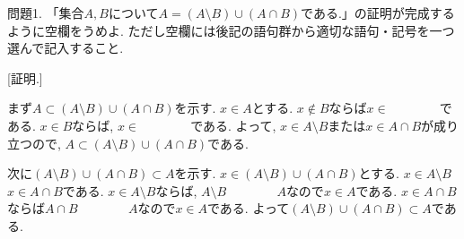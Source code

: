 \documentclass[dvipdfmx,a4paper,11pt]{article}
\theoremstyle{definition}
\begin{document}

\medskip
問題1. 「集合$A,B$について$A  = (A \setminus B) \cup (A \cap B)$である.」の証明が完成するように空欄をうめよ. ただし空欄には後記の語句群から適切な語句・記号を一つ選んで記入すること. %

[証明.]

まず$A \subset (A \setminus B) \cup (A \cap B)$を示す. 
$x \in A$とする. $x \not \in B$ならば$x \in \boxed{\phantom{hogehoge}}$である.
$x \in B$ならば, $x \in \boxed{\phantom{hogehoge}}$である.
よって, $x \in A \setminus B$または$x \in A \cap B$が成り立つので, $A \subset (A \setminus B) \cup (A \cap B)$である.

次に$(A \setminus B) \cup (A \cap B)\subset A$を示す.
$x \in (A \setminus B) \cup (A \cap B)$とする.
$x \in A \setminus B$\boxed{\phantom{hogehoge}}$x \in A \cap B$である.
$x \in A \setminus B$ならば, $A \setminus B \boxed{\phantom{hogehoge}} A$なので$x \in A$である.
$x \in A \cap B$ならば$A \cap B \boxed{\phantom{hogehoge}} A$なので$x \in A$である.
よって$(A \setminus B) \cup (A \cap B)\subset A$である.
\end{document}
